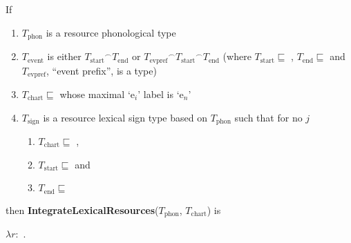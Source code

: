 \begin{ex} 
If 
\begin{enumerate}
\item $T_{\mathrm{phon}}$ is a resource phonological type
\item $T_{\mathrm{event}}$ is either
${T_{\mathrm{start}}}^{\frown}T_{\mathrm{end}}$ or
${T_{\mathrm{evpref}}}^{\frown}{T_{\mathrm{start}}}^{\frown}T_{\mathrm{end}}$ 
\hspace*{1em}(where $T_{\mathrm{start}}\sqsubseteq$
,
$T_{\mathrm{end}}\sqsubseteq$
 and
$T_{\mathrm{evpref}}$, ``event prefix'', is a type)
\label{ex:integlexresTevent} 
\item $T_{\mathrm{chart}}\sqsubseteq$
   whose maximal
             `e$_i$' label is `e$_n$' 
\label{ex:integlexresTchart}
\item $T_{\mathrm{sign}}$ is a resource lexical sign type based on
$T_{\mathrm{phon}}$ such that for no $j$
\begin{enumerate}
\item $T_{\mathrm{chart}}\sqsubseteq$
,
\item   $T_{\mathrm{start}}\sqsubseteq$
   and 
\item   $T_{\mathrm{end}}\sqsubseteq$
\end{enumerate}
\label{ex:integlexresTsign}
\end{enumerate}
then \textbf{IntegrateLexicalResources}($T_{\mathrm{phon}}$,
$T_{\mathrm{chart}}$) is 

\medskip

$\lambda
r:$
. \\
\hspace*{1em}


\end{ex}
